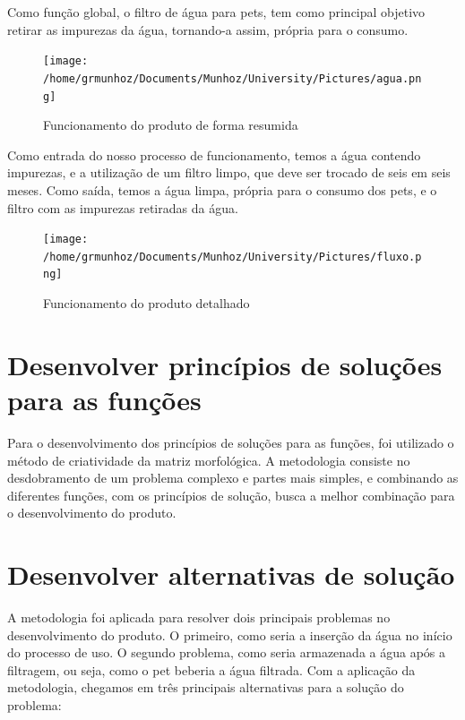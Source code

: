 \documentclass[
	12pt,				%
	openright,			%
	oneside,			%
	a4paper,			%
	english,			%
	french,				%
	spanish,			%
	brazil				%
	]{abntex2}
\begin{document}
Como função global, o filtro de água para pets, tem como principal objetivo retirar as impurezas da água, tornando-a assim, própria para o consumo.

\begin{figure}[H]
\begin{center}
\caption{Funcionamento do produto de forma resumida}
\texttt{[image: /home/grmunhoz/Documents/Munhoz/University/Pictures/agua.png]} 
\label{figetapas}
\end{center}
\end{figure}

Como entrada do nosso processo de funcionamento, temos a água contendo impurezas, e a utilização de um filtro limpo, que deve ser trocado de seis em seis meses. Como saída, temos a água limpa, própria para o consumo dos pets, e o filtro com as impurezas retiradas da água.

\begin{figure}[H]
\begin{center}
\caption{Funcionamento do produto detalhado}
\texttt{[image: /home/grmunhoz/Documents/Munhoz/University/Pictures/fluxo.png]} 
\label{figetapas}
\end{center}
\end{figure}


\section{Desenvolver princípios de soluções para as funções}

Para o desenvolvimento dos princípios de soluções para as funções, foi utilizado o método de criatividade da matriz morfológica. A metodologia consiste no desdobramento de um problema complexo e partes mais simples, e combinando as diferentes funções, com os princípios de solução, busca a melhor combinação para o desenvolvimento do produto.


\section{Desenvolver alternativas de solução}

A metodologia foi aplicada para resolver dois principais problemas no desenvolvimento do produto. O primeiro, como seria a inserção da água no início do processo de uso. O segundo problema, como seria armazenada a água após a filtragem, ou seja, como o pet beberia a água filtrada. Com a aplicação da metodologia, chegamos em três principais alternativas para a solução do problema:
\end{document}
